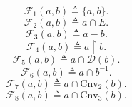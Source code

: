 $$\mathcal{F}_1(a, b) \triangleq \{a, b\}.$$
$$\mathcal{F}_2(a, b) \triangleq a \cap E.$$
$$\mathcal{F}_3(a, b) \triangleq a - b.$$
$$\mathcal{F}_4(a, b) \triangleq a \upharpoonright b.$$
$$\mathcal{F}_5(a, b) \triangleq a \cap \mathcal{D}(b).$$
$$\mathcal{F}_6(a, b) \triangleq a \cap b^{-1}.$$
$$\mathcal{F}_7(a, b) \triangleq a \cap \mathrm{Cnv}_2(b).$$
$$\mathcal{F}_8(a, b) \triangleq a \cap \mathrm{Cnv}_3(b).$$
